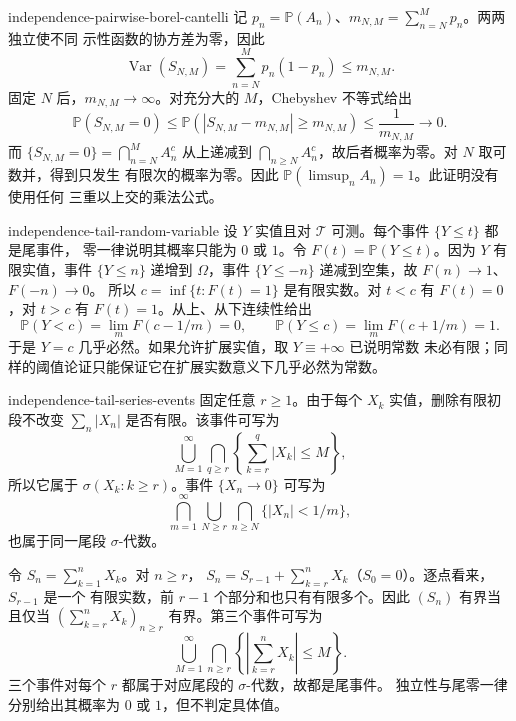 \begin{solution}{independence-pairwise-borel-cantelli}
记 $p_n=\mathbb P(A_n)$、$m_{N,M}=\sum_{n=N}^Mp_n$。两两独立使不同
示性函数的协方差为零，因此
\[
 \operatorname{Var}(S_{N,M})
 =\sum_{n=N}^Mp_n(1-p_n)\le m_{N,M}.
\]
固定 $N$ 后，$m_{N,M}\to\infty$。对充分大的 $M$，Chebyshev 不等式给出
\[
 \mathbb P(S_{N,M}=0)
 \le\mathbb P(|S_{N,M}-m_{N,M}|\ge m_{N,M})
 \le\frac1{m_{N,M}}\longrightarrow0.
\]
而 $\{S_{N,M}=0\}=\bigcap_{n=N}^MA_n^c$ 从上递减到
$\bigcap_{n\ge N}A_n^c$，故后者概率为零。对 $N$ 取可数并，得到只发生
有限次的概率为零。因此 $\mathbb P(\limsup_nA_n)=1$。此证明没有使用任何
三重以上交的乘法公式。
\end{solution}

\begin{solution}{independence-tail-random-variable}
设 $Y$ 实值且对 $\mathcal T$ 可测。每个事件 $\{Y\le t\}$ 都是尾事件，
零一律说明其概率只能为 $0$ 或 $1$。令
$F(t)=\mathbb P(Y\le t)$。因为 $Y$ 有限实值，事件 $\{Y\le n\}$ 递增到
$\Omega$，事件 $\{Y\le-n\}$ 递减到空集，故 $F(n)\to1$、$F(-n)\to0$。
所以 $c=\inf\{t:F(t)=1\}$ 是有限实数。对 $t<c$ 有 $F(t)=0$，对
$t>c$ 有 $F(t)=1$。从上、从下连续性给出
\[
 \mathbb P(Y<c)=\lim_mF(c-1/m)=0,\qquad
 \mathbb P(Y\le c)=\lim_mF(c+1/m)=1.
\]
于是 $Y=c$ 几乎必然。如果允许扩展实值，取 $Y\equiv+\infty$ 已说明常数
未必有限；同样的阈值论证只能保证它在扩展实数意义下几乎必然为常数。
\end{solution}

\begin{solution}{independence-tail-series-events}
固定任意 $r\ge1$。由于每个 $X_k$ 实值，删除有限初段不改变
$\sum_n|X_n|$ 是否有限。该事件可写为
\[
 \bigcup_{M=1}^{\infty}\bigcap_{q\ge r}
       \left\{\sum_{k=r}^q|X_k|\le M\right\},
\]
所以它属于 $\sigma(X_k:k\ge r)$。事件 $\{X_n\to0\}$ 可写为
\[
 \bigcap_{m=1}^{\infty}\bigcup_{N\ge r}\bigcap_{n\ge N}
       \{|X_n|<1/m\},
\]
也属于同一尾段 $\sigma$-代数。

令 $S_n=\sum_{k=1}^nX_k$。对 $n\ge r$，
$S_n=S_{r-1}+\sum_{k=r}^nX_k$（$S_0=0$）。逐点看来，$S_{r-1}$ 是一个
有限实数，前 $r-1$ 个部分和也只有有限多个。因此 $(S_n)$ 有界当且仅当
$(\sum_{k=r}^nX_k)_{n\ge r}$ 有界。第三个事件可写为
\[
 \bigcup_{M=1}^{\infty}\bigcap_{n\ge r}
    \left\{\left|\sum_{k=r}^nX_k\right|\le M\right\}.
\]
三个事件对每个 $r$ 都属于对应尾段的 $\sigma$-代数，故都是尾事件。
独立性与尾零一律分别给出其概率为 $0$ 或 $1$，但不判定具体值。
\end{solution}

